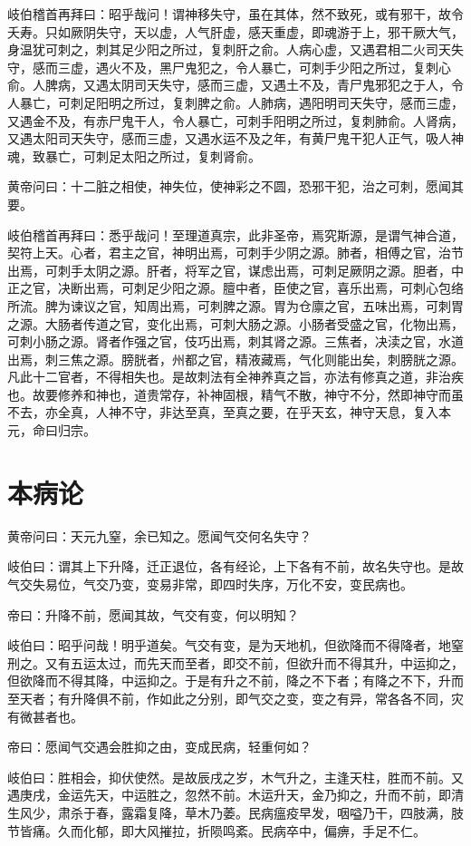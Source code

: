 \documentclass{article}%
\begin{document}
岐伯稽首再拜曰：昭乎哉问！谓神移失守，虽在其体，然不致死，或有邪干，故令夭寿。只如厥阴失守，天以虚，人气肝虚，感天重虚，即魂游于上，邪干厥大气，身温犹可刺之，刺其足少阳之所过，复刺肝之俞。人病心虚，又遇君相二火司天失守，感而三虚，遇火不及，黑尸鬼犯之，令人暴亡，可刺手少阳之所过，复刺心俞。人脾病，又遇太阴司天失守，感而三虚，又遇土不及，青尸鬼邪犯之于人，令人暴亡，可刺足阳明之所过，复刺脾之俞。人肺病，遇阳明司天失守，感而三虚，又遇金不及，有赤尸鬼干人，令人暴亡，可刺手阳明之所过，复刺肺俞。人肾病，又遇太阳司天失守，感而三虚，又遇水运不及之年，有黄尸鬼干犯人正气，吸人神魂，致暴亡，可刺足太阳之所过，复刺肾俞。

黄帝问曰：十二脏之相使，神失位，使神彩之不圆，恐邪干犯，治之可刺，愿闻其要。

岐伯稽首再拜曰：悉乎哉问！至理道真宗，此非圣帝，焉究斯源，是谓气神合道，契符上天。心者，君主之官，神明出焉，可刺手少阴之源。肺者，相傅之官，治节出焉，可刺手太阴之源。肝者，将军之官，谋虑出焉，可刺足厥阴之源。胆者，中正之官，决断出焉，可刺足少阳之源。膻中者，臣使之官，喜乐出焉，可刺心包络所流。脾为谏议之官，知周出焉，可刺脾之源。胃为仓廪之官，五味出焉，可刺胃之源。大肠者传道之官，变化出焉，可刺大肠之源。小肠者受盛之官，化物出焉，可刺小肠之源。肾者作强之官，伎巧出焉，刺其肾之源。三焦者，决渎之官，水道出焉，刺三焦之源。膀胱者，州都之官，精液藏焉，气化则能出矣，刺膀胱之源。凡此十二官者，不得相失也。是故刺法有全神养真之旨，亦法有修真之道，非治疾也。故要修养和神也，道贵常存，补神固根，精气不散，神守不分，然即神守而虽不去，亦全真，人神不守，非达至真，至真之要，在乎天玄，神守天息，复入本元，命曰归宗。
\section{本病论}
黄帝问曰：天元九窒，余已知之。愿闻气交何名失守？

岐伯曰：谓其上下升降，迁正退位，各有经论，上下各有不前，故名失守也。是故气交失易位，气交乃变，变易非常，即四时失序，万化不安，变民病也。

帝曰：升降不前，愿闻其故，气交有变，何以明知？

岐伯曰：昭乎问哉！明乎道矣。气交有变，是为天地机，但欲降而不得降者，地窒刑之。又有五运太过，而先天而至者，即交不前，但欲升而不得其升，中运抑之，但欲降而不得其降，中运抑之。于是有升之不前，降之不下者；有降之不下，升而至天者；有升降俱不前，作如此之分别，即气交之变，变之有异，常各各不同，灾有微甚者也。

帝曰：愿闻气交遇会胜抑之由，变成民病，轻重何如？

岐伯曰：胜相会，抑伏使然。是故辰戌之岁，木气升之，主逢天柱，胜而不前。又遇庚戌，金运先天，中运胜之，忽然不前。木运升天，金乃抑之，升而不前，即清生风少，肃杀于春，露霜复降，草木乃萎。民病瘟疫早发，咽嗌乃干，四肢满，肢节皆痛。久而化郁，即大风摧拉，折陨鸣紊。民病卒中，偏痹，手足不仁。
\end{document}
